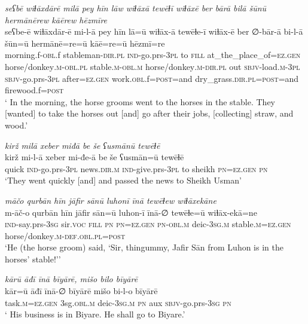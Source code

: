 \ea \label{ŠJ.66}
\textit{seʕbē wiɫāxdārē milā pey hīn lāw wiɫāxā tewēɫī wiɫāxē ber bārā bilā šūnū hermānērew kāērew hēzmīre} \\ 
\gll seʕbe-ē wiɫāxdār-ē mi-l-ā pey hīn lā=ū wiɫāx-ā tewēɫe-ī wiɫāx-ē ber ∅-bār-ā bi-l-ā šūn=ū hermānē=re=ū kāē=re=ū hēzmī=re \\ 
 morning.f\textsc{-obl}.f stableman\textsc{-dir}\textsc{.pl} \textsc{ind-}go.prs\textsc{-3pl} to \textsc{fill} at\_the\_place\_of\textsc{=ez.gen} horse/donkey\textsc{.m}\textsc{-obl}\textsc{.pl} stable\textsc{.m}\textsc{-obl}\textsc{.m} horse/donkey\textsc{.m}\textsc{-dir}\textsc{.pl} out \textsc{sbjv-}load\textsc{.m}\textsc{-3pl} \textsc{sbjv-}go.prs\textsc{-3pl} after\textsc{=ez.gen} work\textsc{.obl}.f\textsc{=\textsc{post}}=and dry\_grass\textsc{.dir}\textsc{.pl}\textsc{=\textsc{post}}=and firewood.f\textsc{=\textsc{post}} \\ 
\glt ` In the morning, the horse grooms went to the horses in the stable. They [wanted] to take the horses out [and] go after their jobs, [collecting] straw, and wood.'
\z 
 
\ea \label{ŠJ.68}
\textit{kirž milā xeber miđā be še ʕusmānū tewēɫē} \\ 
\gll kirž mi-l-ā xeber mi-đe-ā be še ʕusmān=ū tewēɫē \\ 
 quick \textsc{ind-}go.prs\textsc{-3pl} news\textsc{.dir}\textsc{.m} \textsc{ind-}give.prs\textsc{-3pl} to sheikh \textsc{pn}\textsc{=ez.gen} \textsc{pn} \\ 
\glt `They went quickly [and] and passed the news to Sheikh Usman'
\z 
 
\ea \label{ŠJ.71}
\textit{māčo qurbān hīn jāfir sānū luhonī īnā tewēɫew wiɫāxekāne} \\ 
\gll m-āč-o qurbān hīn jāfir sān=ū luhon-ī īnā-∅ tewēɫe=ū wiɫāx-ekā=ne \\ 
 \textsc{ind-}say.prs\textsc{-3sg} sir.\textsc{voc} \textsc{fill} \textsc{pn} \textsc{pn}\textsc{=ez.gen} \textsc{pn}\textsc{-obl}\textsc{.m} deic\textsc{-3sg}\textsc{.m} stable\textsc{.m}\textsc{=ez.gen} horse/donkey\textsc{.m}\textsc{-def}\textsc{.obl}\textsc{.pl}\textsc{=\textsc{post}} \\ 
\glt `He (the horse groom) said, ‘Sir, thingummy, Jafir Sān from Luhon is in the horses’ stable!’'
\z 
 
\ea \label{ŠJ.75}
\textit{kārū āđī īnā bīyārē, mišo bilo bīyārē} \\ 
\gll kār=ū āđī īnā-∅ bīyārē mišo bi-l-o bīyārē \\ 
 task\textsc{.m}\textsc{=ez.gen} 3sg\textsc{.obl}\textsc{.m} deic\textsc{-3sg}\textsc{.m} \textsc{pn} aux \textsc{sbjv-}go.prs\textsc{-3sg} \textsc{pn} \\ 
\glt ` His business is in Biyare. He shall go to Biyare.'
\z 
 
